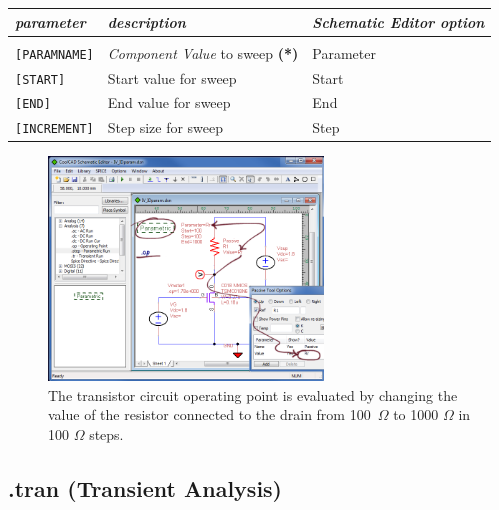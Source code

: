 \begin{tabular}{lp{5.5cm}p{5cm}}
\textit{parameter} & \textit{description} & \textit{\textsf{Schematic Editor} option}\\ \hline \\ \vspace{-0.8\parskip}
\texttt{[PARAMNAME]} & \textit{Component Value} to sweep \textbf{(*)} & \textsf{Parameter}\\
\texttt{[START]} & Start value for sweep & \textsf{Start} \\
\texttt{[END]} & End value for sweep & \textsf{End} \\
\texttt{[INCREMENT]} & Step size for sweep & \textsf{Step}
\end{tabular}


\begin{figure}
    \includegraphics[width=0.65\textwidth]{./figures/spice_analysis_figures/SPICEAnalysis_parametric1.png}
    \caption{{The transistor circuit operating point is evaluated by changing the value of the resistor connected to the drain from \mbox{100 $\Omega$} to 1000 $\Omega$ in 100 $\Omega$ steps.}}
  \label{fig_spiceanalysis_paramexample}
\end{figure}

\subsection{.tran (Transient Analysis)}
\label{subsec_satco_tran}


